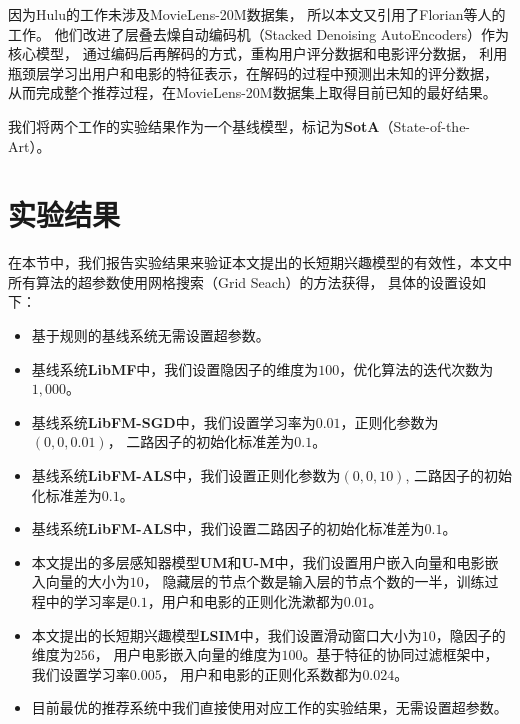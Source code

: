 因为Hulu的工作未涉及MovieLens-20M数据集，
所以本文又引用了Florian等人\parencite{strub2016hybrid}的工作。
他们改进了层叠去燥自动编码机（Stacked Denoising AutoEncoders）作为核心模型，
通过编码后再解码的方式，重构用户评分数据和电影评分数据，
利用瓶颈层学习出用户和电影的特征表示，在解码的过程中预测出未知的评分数据，
从而完成整个推荐过程，在MovieLens-20M数据集上取得目前已知的最好结果。

我们将两个工作的实验结果作为一个基线模型，标记为\textbf{SotA}（State-of-the-Art）。

\section{实验结果}
在本节中，我们报告实验结果来验证本文提出的长短期兴趣模型的有效性，本文中所有算法的超参数使用网格搜索（Grid Seach）的方法获得，
具体的设置设如下：

\begin{itemize}
\item
基于规则的基线系统无需设置超参数。
\item
基线系统\textbf{LibMF}中，我们设置隐因子的维度为$100$，优化算法的迭代次数为$1,000$。
\item
基线系统\textbf{LibFM-SGD}中，我们设置学习率为$0.01$，正则化参数为$(0,0,0.01)$，
二路因子的初始化标准差为$0.1$。
\item
基线系统\textbf{LibFM-ALS}中，我们设置正则化参数为$(0,0,10)$,
二路因子的初始化标准差为$0.1$。
\item
基线系统\textbf{LibFM-ALS}中，我们设置二路因子的初始化标准差为$0.1$。
\item
本文提出的多层感知器模型\textbf{UM}和\textbf{U-M}中，我们设置用户嵌入向量和电影嵌入向量的大小为$10$，
隐藏层的节点个数是输入层的节点个数的一半，训练过程中的学习率是$0.1$，用户和电影的正则化洗漱都为$0.01$。
\item
本文提出的长短期兴趣模型\textbf{LSIM}中，我们设置滑动窗口大小为$10$，隐因子的维度为$256$，
用户电影嵌入向量的维度为$100$。基于特征的协同过滤框架中，我们设置学习率$0.005$，
用户和电影的正则化系数都为$0.024$。
\item
目前最优的推荐系统中我们直接使用对应工作的实验结果，无需设置超参数。
\end{itemize}

